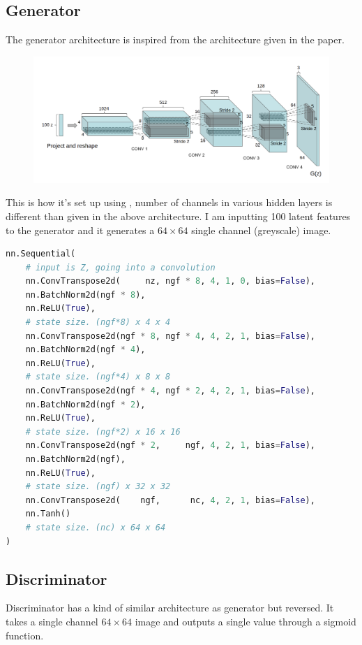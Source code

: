 \documentclass{article}
\begin{document}
\subsection{Generator}
The generator architecture is inspired from the architecture given in the \cite{2} paper.
\begin{figure}[H]
  \includegraphics[width=\linewidth]{images/architecture.png}
\end{figure}
This is how it's set up using , number of channels in various hidden layers is different than given in the above architecture. I am inputting 100 latent features to the generator and it generates a $64\times64$ single channel (greyscale) image.
\begin{lstlisting}[language=Python]
nn.Sequential(
    # input is Z, going into a convolution
    nn.ConvTranspose2d(     nz, ngf * 8, 4, 1, 0, bias=False),
    nn.BatchNorm2d(ngf * 8),
    nn.ReLU(True),
    # state size. (ngf*8) x 4 x 4
    nn.ConvTranspose2d(ngf * 8, ngf * 4, 4, 2, 1, bias=False),
    nn.BatchNorm2d(ngf * 4),
    nn.ReLU(True),
    # state size. (ngf*4) x 8 x 8
    nn.ConvTranspose2d(ngf * 4, ngf * 2, 4, 2, 1, bias=False),
    nn.BatchNorm2d(ngf * 2),
    nn.ReLU(True),
    # state size. (ngf*2) x 16 x 16
    nn.ConvTranspose2d(ngf * 2,     ngf, 4, 2, 1, bias=False),
    nn.BatchNorm2d(ngf),
    nn.ReLU(True),
    # state size. (ngf) x 32 x 32
    nn.ConvTranspose2d(    ngf,      nc, 4, 2, 1, bias=False),
    nn.Tanh()
    # state size. (nc) x 64 x 64
)
\end{lstlisting}

\subsection{Discriminator}

Discriminator has a kind of similar architecture as generator but reversed. It takes a single channel $64 \times 64$ image and outputs a single value through a sigmoid function.
\end{document}
